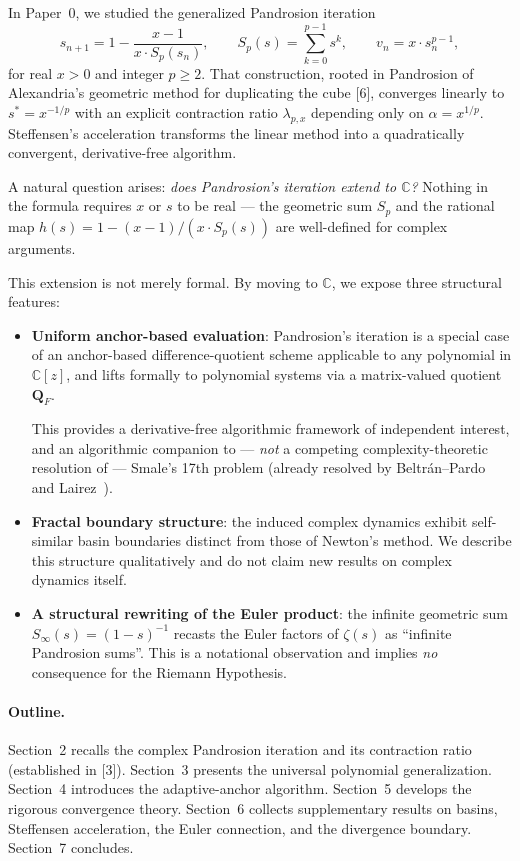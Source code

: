 \documentclass[11pt,a4paper]{article}
\begin{document}
In Paper~0, we studied the generalized Pandrosion iteration
\begin{equation}
s_{n+1} = 1 - \frac{x - 1}{x \cdot S_p(s_n)}, \qquad S_p(s) = \sum_{k=0}^{p-1} s^k, \qquad v_n = x \cdot s_n^{p-1},
\end{equation}
for real $x > 0$ and integer $p \ge 2$. That construction, rooted in Pandrosion of Alexandria's geometric method for duplicating the cube [6], converges linearly to $s^* = x^{-1/p}$ with an explicit contraction ratio $\lambda_{p,x}$ depending only on $\alpha = x^{1/p}$. Steffensen's acceleration transforms the linear method into a quadratically convergent, derivative-free algorithm.

A natural question arises: \emph{does Pandrosion's iteration extend to $\mathbb{C}$?} Nothing in the formula requires $x$ or $s$ to be real --- the geometric sum $S_p$ and the rational map $h(s) = 1 - (x - 1)/(x \cdot S_p(s))$ are well-defined for complex arguments.

This extension is not merely formal. By moving to $\mathbb{C}$, we expose three structural features:
\begin{itemize}
\item \textbf{Uniform anchor-based evaluation}: Pandrosion's iteration is a special case of an anchor-based difference-quotient scheme applicable to any polynomial in $\mathbb{C}[z]$, and lifts formally to polynomial systems via a matrix-valued quotient $\mathbf{Q}_F$.

This provides a derivative-free algorithmic framework of independent interest, and an algorithmic companion to --- \emph{not} a competing complexity-theoretic resolution of --- Smale's 17th problem (already resolved by Beltr\'an--Pardo~\cite{beltranpardo} and Lairez~\cite{lairez}).
\item \textbf{Fractal boundary structure}: the induced complex dynamics exhibit self-similar basin boundaries distinct from those of Newton's method. We describe this structure qualitatively and do not claim new results on complex dynamics itself.
\item \textbf{A structural rewriting of the Euler product}: the infinite geometric sum $S_\infty(s) = (1 - s)^{-1}$ recasts the Euler factors of $\zeta(s)$ as ``infinite Pandrosion sums''. This is a notational observation and implies \emph{no} consequence for the Riemann Hypothesis.
\end{itemize}

\paragraph{Outline.} Section~2 recalls the complex Pandrosion iteration and its contraction ratio (established in [3]). Section~3 presents the universal polynomial generalization. Section~4 introduces the adaptive-anchor algorithm. Section~5 develops the rigorous convergence theory. Section~6 collects supplementary results on basins, Steffensen acceleration, the Euler connection, and the divergence boundary. Section~7 concludes.
\end{document}
